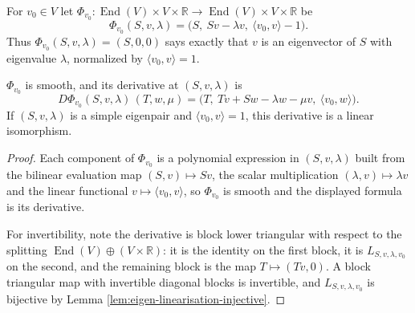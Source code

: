 \begin{definition}
\label{def:augmented-eigen-equation}
\leanok
For $v_0 \in V$ let $\Phi_{v_0} : \operatorname{End}(V) \times V \times \mathbb{R} \to \operatorname{End}(V) \times V \times \mathbb{R}$ be
\[
  \Phi_{v_0}(S, v, \lambda) = \bigl(S,\ Sv - \lambda v,\ \langle v_0, v\rangle - 1\bigr).
\]
Thus $\Phi_{v_0}(S,v,\lambda) = (S,0,0)$ says exactly that $v$ is an eigenvector of $S$ with eigenvalue $\lambda$, normalized by $\langle v_0, v\rangle = 1$.
\end{definition}

\begin{lemma}
\label{lem:augmented-eigen-equation-derivative}
\leanok
{}
$\Phi_{v_0}$ is smooth, and its derivative at $(S,v,\lambda)$ is
\[
  D\Phi_{v_0}(S,v,\lambda)\,(T,w,\mu) = \bigl(T,\ Tv + Sw - \lambda w - \mu v,\ \langle v_0, w\rangle\bigr) .
\]
If $(S,v,\lambda)$ is a simple eigenpair and $\langle v_0, v\rangle = 1$, this derivative is a linear isomorphism.
\end{lemma}

\begin{proof}
\leanok
{}
Each component of $\Phi_{v_0}$ is a polynomial expression in $(S,v,\lambda)$ built from the bilinear evaluation map $(S,v) \mapsto Sv$, the scalar multiplication $(\lambda,v)\mapsto \lambda v$ and the linear functional $v \mapsto \langle v_0,v\rangle$, so $\Phi_{v_0}$ is smooth and the displayed formula is its derivative.

For invertibility, note the derivative is block lower triangular with respect to the splitting $\operatorname{End}(V) \oplus (V \times \mathbb{R})$: it is the identity on the first block, it is $L_{S,v,\lambda,v_0}$ on the second, and the remaining block is the map $T \mapsto (Tv, 0)$. A block triangular map with invertible diagonal blocks is invertible, and $L_{S,v,\lambda,v_0}$ is bijective by Lemma \ref{lem:eigen-linearisation-injective}.
\end{proof}

